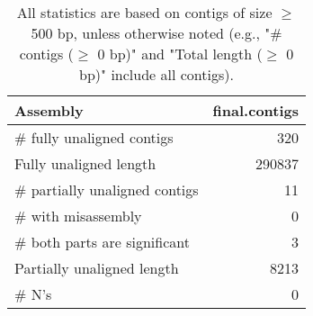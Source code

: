 \documentclass[12pt,a4paper]{article}
\begin{document}
\begin{table}[ht]
\begin{center}
\caption{All statistics are based on contigs of size $\geq$ 500 bp, unless otherwise noted (e.g., "\# contigs ($\geq$ 0 bp)" and "Total length ($\geq$ 0 bp)" include all contigs).}
\begin{tabular}{|l*{1}{|r}|}
\hline
Assembly & final.contigs \\ \hline
\# fully unaligned contigs & 320 \\ \hline
Fully unaligned length & 290837 \\ \hline
\# partially unaligned contigs & 11 \\ \hline
\hspace{5mm}\# with misassembly & 0 \\ \hline
\hspace{5mm}\# both parts are significant & 3 \\ \hline
Partially unaligned length & 8213 \\ \hline
\# N's & 0 \\ \hline
\end{tabular}
\end{center}
\end{table}
\end{document}
